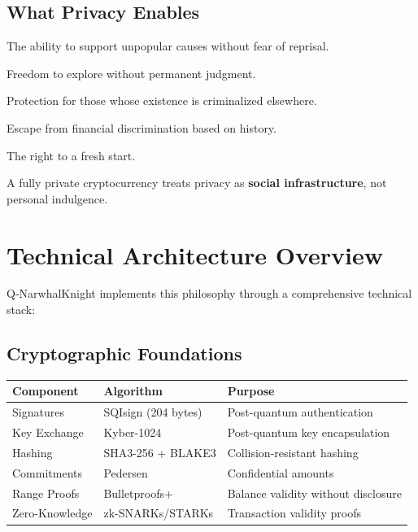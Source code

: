\documentclass[12pt,a4paper]{article}
\begin{document}
\subsection{What Privacy Enables}

\begin{description}[leftmargin=1cm]
    \item[Dissent:] The ability to support unpopular causes without fear of reprisal.
    \item[Experimentation:] Freedom to explore without permanent judgment.
    \item[Minority Survival:] Protection for those whose existence is criminalized elsewhere.
    \item[Economic Mobility:] Escape from financial discrimination based on history.
    \item[Personal Reinvention:] The right to a fresh start.
\end{description}

A fully private cryptocurrency treats privacy as \textbf{social infrastructure}, not personal indulgence.

\section{Technical Architecture Overview}

Q-NarwhalKnight implements this philosophy through a comprehensive technical stack:

\subsection{Cryptographic Foundations}

\begin{center}
\begin{tabular}{|l|l|l|}
\hline
\textbf{Component} & \textbf{Algorithm} & \textbf{Purpose} \\
\hline
Signatures & SQIsign (204 bytes) & Post-quantum authentication \\
Key Exchange & Kyber-1024 & Post-quantum key encapsulation \\
Hashing & SHA3-256 + BLAKE3 & Collision-resistant hashing \\
Commitments & Pedersen & Confidential amounts \\
Range Proofs & Bulletproofs+ & Balance validity without disclosure \\
Zero-Knowledge & zk-SNARKs/STARKs & Transaction validity proofs \\
\hline
\end{tabular}
\end{center}
\end{document}
